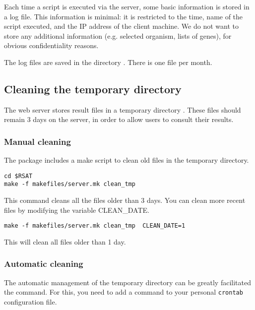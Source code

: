 \documentclass[12pt,a4paper, twoside]{scrreprt} %
\begin{document}
Each time a script is executed via the \RSAT server, some basic
information is stored in a log file. This information is minimal: it
is restricted to the time, name of the script executed, and the IP
address of the client machine. We do not want to store any additional
information (e.g. selected organism, lists of genes), for obvious
confidentiality reasons.

The log files are saved in the directory . There
is one file per month.


\subsection{Cleaning the temporary directory}

The web server stores result files in a temporary directory
. These files should remain 3 days on
the server, in order to allow users to consult their results.

\subsubsection{Manual cleaning}

The \RSAT package includes a make script to clean old files in the
temporary directory.

\begin{lstlisting}
cd $RSAT
make -f makefiles/server.mk clean_tmp
\end{lstlisting}

This command cleans all the files older than 3 days. You can clean
more recent files by modifying the variable CLEAN\_DATE.

\begin{lstlisting}
make -f makefiles/server.mk clean_tmp  CLEAN_DATE=1
\end{lstlisting}

This will clean all files older than 1 day.

\subsubsection{Automatic cleaning}

The automatic management of the temporary directory can be greatly
facilitated the  command. For this, you need to add a
command to your personal \texttt{crontab} configuration file.
\end{document}
